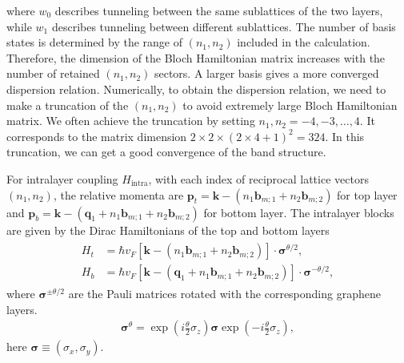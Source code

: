 \documentclass[10pt, oneside]{article}
\newcommand{\te}{\theta}
\newcommand{\mr}[1]{\mathrm{#1}}
\newcommand{\p}[1]{\left(#1\right)}
\newcommand{\bb}[1]{\left[#1\right]}
\begin{document}
where \(w_0\) describes tunneling between the same sublattices of the two layers, while \(w_1\) describes tunneling between different sublattices. The number of basis states is determined by the range of \((n_1,n_2)\) included in the calculation. Therefore, the dimension of the Bloch Hamiltonian matrix increases with the number of retained \((n_1,n_2)\) sectors. A larger basis gives a more converged dispersion relation. Numerically, to obtain the dispersion relation, we need to make a truncation of the \(\p{n_1, n_2}\) to avoid extremely large Bloch Hamiltonian matrix. We often achieve the truncation by setting  \(n_1,n_2=-4,-3,\ldots,4\). It corresponds to the matrix dimension \(2\times 2 \times \p{2 \times 4 +1}^2 = 324\). In this truncation, we can get a good convergence of the band structure.

For intralayer coupling \(H_\mr{intra}\), with each index of reciprocal lattice vectors \((n_1,n_2)\), the relative momenta are \(\bm{p}_t = \bm{k} - \p{n_1 \bm{b}_{m;1} + n_2 \bm{b}_{m;2}} \) for top layer and \(\bm{p}_b = \bm{k} - \p{\bm{q}_{1} + n_1 \bm{b}_{m;1} + n_2 \bm{b}_{m;2}} \) for bottom layer. The intralayer blocks are given by the Dirac Hamiltonians of the top and bottom layers
\begin{align}
	\begin{split}
		H_{t} & = \hbar v_{F} \bb{\bm{k} - \p{n_1 \bm{b}_{m;1} + n_2 \bm{b}_{m;2}} } \cdot \bm{\sigma}^{\te/2}, \\
		H_{b} & = \hbar v_{F} \bb{\bm{k} - \p{\bm{q}_{1} + n_1 \bm{b}_{m;1} + n_2 \bm{b}_{m;2}} } \cdot \bm{\sigma}^{-\te/2},
	\end{split}
\end{align}
where \(\bm{\sigma}^{\pm\theta/2}\) are the Pauli matrices rotated with the corresponding graphene layers.
\begin{align}
	\bm{\sigma}^{\te} = \exp\p{i \frac{\te}{2} \sigma_{z}} \bm{\sigma} \exp\p{- i \frac{\te}{2} \sigma_{z}},
\end{align}
here \(\bm{\sigma}\equiv(\sigma_x,\sigma_y)\).

\end{document}
